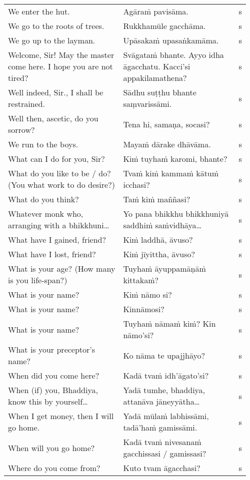 \documentclass[a5paper]{memoir}
\begin{document}
\begin{longtable}{L{0.48\linewidth} L{0.48\linewidth} H}
We enter the hut. & Agāraṁ pavisāma. & s\\[0pt]
We go to the roots of trees. & Rukkhamūle gacchāma. & s\\[0pt]
We go up to the layman. & Upāsakaṁ upasaṅkamāma. & s\\[0pt]
Welcome, Sir! May the master come here. I hope you are not tired? & Svāgataṁ bhante. Ayyo idha āgacchatu. Kacci'si appakilamathena? & s\\[0pt]
Well indeed, Sir., I shall be restrained. & Sādhu suṭṭhu bhante saṃvarissāmi. & s\\[0pt]
Well then, ascetic, do you sorrow? & Tena hi, samaṇa, socasi? & s\\[0pt]
We run to the boys. & Mayaṁ dārake dhāvāma. & s\\[0pt]
What can I do for you, Sir? & Kiṁ tuyhaṁ karomi, bhante? & s\\[0pt]
What do you like to be / do? (You what work to do desire?) & Tvaṁ kiṁ kammaṁ kātuṁ icchasi? & s\\[0pt]
What do you think? & Taṁ kiṁ maññasi? & s\\[0pt]
Whatever monk who, arranging with a bhikkhuni\ldots{} & Yo pana bhikkhu bhikkhuniyā saddhiṁ saṁvidhāya\ldots{} & s\\[0pt]
What have I gained, friend? & Kiṁ laddhā, āvuso? & s\\[0pt]
What have I lost, friend? & Kiṁ jīyittha, āvuso? & s\\[0pt]
What is your age? (How many is you life-span?) & Tuyhaṁ āyuppamāṇāṁ kittakaṁ? & s\\[0pt]
What is your name? & Kiṁ nāmo si? & s\\[0pt]
What is your name? & Kinnāmosi? & s\\[0pt]
What is your name? & Tuyhaṁ nāmaṁ kiṁ? Kin nāmo'si? & s\\[0pt]
What is your preceptor's name? & Ko nāma te upajjhāyo? & s\\[0pt]
When did you come here? & Kadā tvaṁ idh'āgato'si? & s\\[0pt]
When (if) you, Bhaddiya, know this by yourself\ldots{} & Yadā tumhe, bhaddiya, attanāva jāneyyātha\ldots{} & s\\[0pt]
When I get money, then I will go home. & Yadā mūlaṁ labhissāmi, tadā'haṁ gamissāmi. & s\\[0pt]
When will you go home? & Kadā tvaṁ nivesanaṁ gacchissasi / gamissasi? & s\\[0pt]
Where do you come from? & Kuto tvam āgacchasi? & s\\[0pt]

\end{longtable}
\end{document}
